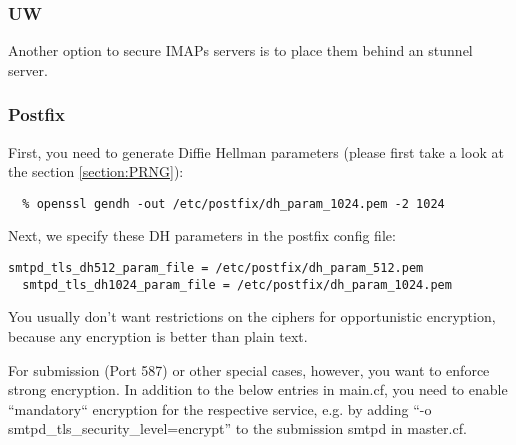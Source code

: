 \subsubsection{UW}


Another option to secure IMAPs servers is to place them behind an stunnel server. 


\subsubsection{Postfix}



First, you need to generate Diffie Hellman parameters (please first take a look at the section \ref{section:PRNG}):

\begin{lstlisting}[breaklines]
  % openssl gendh -out /etc/postfix/dh_param_512.pem -2 512
  % openssl gendh -out /etc/postfix/dh_param_1024.pem -2 1024
\end{lstlisting}

Next, we specify these DH parameters in the postfix config file:

\begin{lstlisting}[breaklines]
  smtpd_tls_dh512_param_file = /etc/postfix/dh_param_512.pem
  smtpd_tls_dh1024_param_file = /etc/postfix/dh_param_1024.pem
\end{lstlisting}

You usually don't want restrictions on the ciphers for opportunistic
encryption, because any encryption is better than plain text. 

For submission (Port 587) or other special cases, however, you want to
enforce strong encryption. In addition to the below entries in
main.cf, you need to enable ``mandatory`` encryption for the
respective service, e.g. by adding ``-o
smtpd\_tls\_security\_level=encrypt'' to the submission smtpd in
master.cf.


